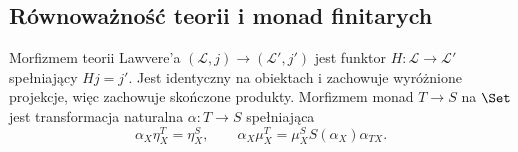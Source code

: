 \subsection{Równoważność teorii i monad finitarych}

\begin{definicja}\label{cat:def:lawvere-morphisms}
Morfizmem teorii Lawvere'a $(\mathcal L,j)\to(\mathcal L',j')$ jest funktor $H:\mathcal L\to\mathcal L'$ spełniający $Hj=j'$. Jest identyczny na obiektach i zachowuje wyróżnione projekcje, więc zachowuje skończone produkty. Morfizmem monad $T\to S$ na $\Set$ jest transformacja naturalna $\alpha:T\to S$ spełniająca
\[
 \alpha_X\eta^T_X=\eta^S_X,\qquad
 \alpha_X\mu^T_X=\mu^S_X S(\alpha_X)\alpha_{TX}.
\]
\end{definicja}

